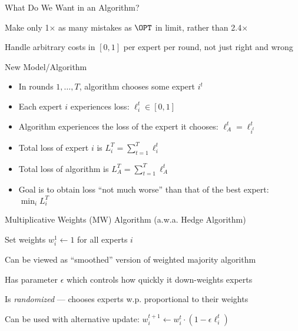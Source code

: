 \documentclass[11pt,aspectratio=169,handout]{beamer}
\begin{document}
  
  \begin{frame}{What Do We Want in an Algorithm?}
   \begin{itemizes}[1.5em]
    \item Make only 1$\times$ as many mistakes as $\OPT$ in limit, rather than 2.4$\times$
    \item Handle arbitrary costs in $[0,1]$ per expert per round, not just right and wrong
   \end{itemizes}
  \end{frame}
  
  
  \begin{frame}{New Model/Algorithm}
   \begin{itemize}[<+->]
   \setlength{\itemsep}{1em}
    \item In rounds $1,\ldots, T$, algorithm \alert{chooses some expert} $i^t$
    \item Each expert $i$ \alert{experiences loss}: $\ell_i^t \in [0,1]$
    \item Algorithm experiences the loss of the expert it chooses: $\ell_A^t = \ell_{i^t}^t$
    \item Total loss of expert $i$ is $L_i^T = \sum_{t=1}^T \ell_i^t$
    \item Total loss of algorithm is $L_A^T = \sum_{t=1}^T \ell_A^t$
    \item Goal is to obtain loss \alert{``not much worse''} than that of the best expert: $\min_i L_i^T$
   \end{itemize}
  \end{frame}
  
  
  \begin{frame}{Multiplicative Weights (MW) Algorithm (a.w.a. Hedge Algorithm)}
   \begin{algorithm*}[H]
    Set weights $w_i^1 \leftarrow 1$ for all experts $i$\;
   \end{algorithm*}
   
   \vspace{1em}
   
   \begin{itemizes}[0.7em]\small
    \item<2-> Can be viewed as ``smoothed'' version of weighted majority algorithm
    \item<3-> Has parameter $\epsilon$ which controls how quickly it down-weights experts
    \item<4-> Is \emph{randomized} --- chooses experts w.p. proportional to their weights
    \item<5-> Can be used with alternative update: $w_i^{t+1} \leftarrow w_i^t \cdot(1-\epsilon \ell_i^t)$
   \end{itemizes}
  \end{frame}
  
\end{document}
